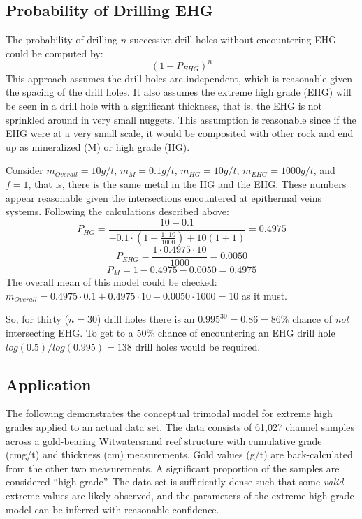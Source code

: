 \FloatBarrier
\subsection{Probability of Drilling EHG}
\label{subsec:02probehg}

The probability of drilling $n$ successive drill holes without encountering EHG could be computed by:
\[
    \left( 1 - P_{EHG} \right)^n
\]
This approach assumes the drill holes are independent, which is reasonable given the spacing of the drill holes. It also assumes the extreme high grade (EHG) will be seen in a drill hole with a significant thickness, that is, the EHG is not sprinkled around in very small nuggets. This assumption is reasonable since if the EHG were at a very small scale, it would be composited with other rock and end up as mineralized (M) or high grade (HG).

Consider $m_{Overall} = 10 g/t$, $m_{M} = 0.1 g/t$, $m_{HG} = 10 g/t$, $m_{EHG} = 1000 g/t$, and $f=1$, that is, there is the same metal in the HG and the EHG.  These numbers appear reasonable given the intersections encountered at epithermal veins systems. Following the calculations described above:
\[
    P_{HG} =
    \frac{10 - 0.1}
    {
        -0.1 \cdot \left( 1+\frac{1 \cdot 10}{1000}\right) + 10(1+1)
    }
    = 0.4975
\]
\[
    P_{EHG} = \frac{1 \cdot 0.4975 \cdot 10}{1000} = 0.0050
\]
\[
    P_{M} = 1 - 0.4975 - 0.0050 = 0.4975
\]
The overall mean of this model could be checked: $m_{Overall} = 0.4975 \cdot 0.1 + 0.4975 \cdot 10 + 0.0050 \cdot 1000 = 10$ as it must.

So, for thirty ($n=30$) drill holes there is an $0.995^{30}=0.86=86\%$ chance of {\em not} intersecting EHG.  To get to a 50\% chance of encountering an EHG drill hole $log(0.5)/log(0.995)=138$ drill holes would be required.


\FloatBarrier
\subsection{Application}
\label{subsec:02application}

The following demonstrates the conceptual trimodal model for extreme high grades applied to an actual data set. The data consists of 61,027 channel samples across a gold-bearing Witwatersrand reef structure with cumulative grade (cmg/t) and thickness (cm) measurements. Gold values (g/t) are back-calculated from the other two measurements. A significant proportion of the samples are considered ``high grade''. The data set is sufficiently dense such that some \emph{valid} extreme values are likely observed, and the parameters of the extreme high-grade model can be inferred with reasonable confidence.

